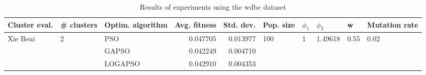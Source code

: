 \begin{table}
\centering
\caption{Results of experiments using the wdbc dataset}
\begin{tabular}{lllrrlllll}
\toprule
            Cluster eval. &        \# clusters & Optim. algorithm &  Avg. fitness &  Std. dev. &            Pop. size &         $\phi_{1}$ &               $\phi_{2}$ &                     w &         Mutation rate \\
\midrule
\multirow{3}{*}{Xie Beni} & \multirow{3}{*}{2} &              PSO &      0.047705 &   0.013977 & \multirow{3}{*}{100} & \multirow{3}{*}{1} & \multirow{3}{*}{1.49618} & \multirow{3}{*}{0.55} & \multirow{3}{*}{0.02} \\
                          &                    &            GAPSO &      0.042249 &   0.004710 &                      &                    &                          &                       &                       \\
                          &                    &          LOGAPSO &      0.042910 &   0.004353 &                      &                    &                          &                       &                       \\
\bottomrule
\end{tabular}
\end{table}
